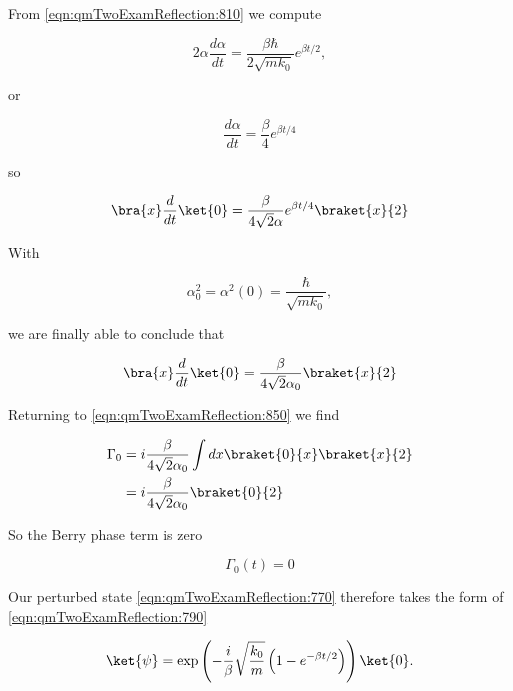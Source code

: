 From \ref{eqn:qmTwoExamReflection:810} we compute

\begin{equation}\label{eqn:qmTwoExamReflection:870}
2 \alpha \frac{d\alpha}{dt} = \frac{\beta \hbar}{2 \sqrt{m k_0}} e^{\beta t/2},
\end{equation}

or

\begin{equation}\label{eqn:qmTwoExamReflection:890}
\frac{d\alpha}{dt} = \frac{\beta}{4} e^{\beta t/4}
\end{equation}

so

\begin{equation}\label{eqn:qmTwoExamReflection:n}
\bra{x} \frac{d}{dt} \ket{0} 
=
\frac{\beta}{4 \sqrt{2} \alpha} e^{\beta t/4}
\braket{x}{2} 
\end{equation}

With 

\begin{equation}\label{eqn:qmTwoExamReflection:n}
\alpha_0^2 = \alpha^2(0) = \frac{\hbar}{\sqrt{m k_0}},
\end{equation}

we are finally able to conclude that

\begin{equation}\label{eqn:qmTwoExamReflection:910}
\bra{x} \frac{d}{dt} \ket{0} 
=
\frac{\beta}{4 \sqrt{2} \alpha_0} 
\braket{x}{2}
\end{equation}

Returning to \ref{eqn:qmTwoExamReflection:850} we find

\begin{align*}
\Gamma_0 &= 
i 
\frac{\beta}{4 \sqrt{2} \alpha_0} 
\int dx \braket{0}{x}
\braket{x}{2} \\
&= 
i 
\frac{\beta}{4 \sqrt{2} \alpha_0} 
\braket{0}{2}
\end{align*}

So the Berry phase term is zero

\begin{equation}\label{eqn:qmTwoExamReflection:930}
\Gamma_0(t) = 0
\end{equation}

Our perturbed state \ref{eqn:qmTwoExamReflection:770} therefore takes the form of \ref{eqn:qmTwoExamReflection:790} 

\begin{equation}\label{eqn:qmTwoExamReflection:950}
\ket{\psi} =
\exp\left(
- \frac{i}{\beta} \sqrt{\frac{k_0}{m}} 
\left( 1 - e^{-\beta t/2} \right)
\right) \ket{0}.
\end{equation}

